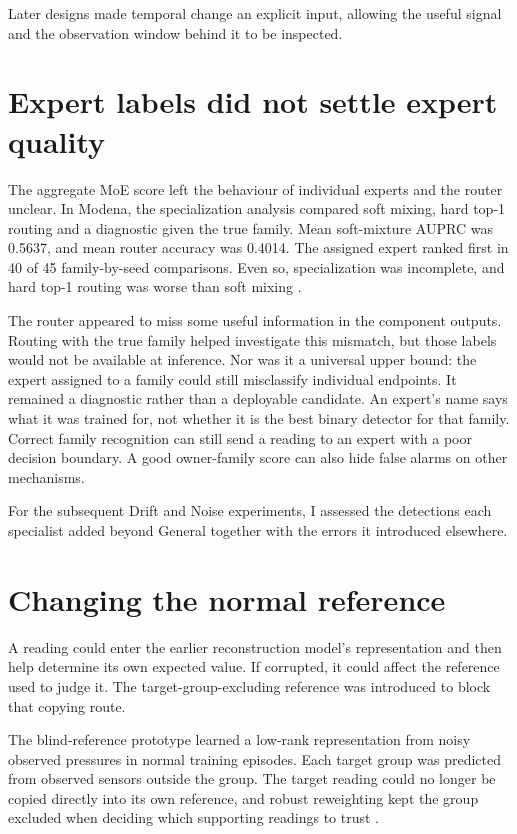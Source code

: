 Later designs made temporal change an explicit input, allowing the useful signal and the observation window behind it to be inspected.

\section{Expert labels did not settle expert quality}
The aggregate MoE score left the behaviour of individual experts and the router unclear. In Modena, the specialization analysis compared soft mixing, hard top-1 routing and a diagnostic given the true family. Mean soft-mixture AUPRC was 0.5637, and mean router accuracy was 0.4014. The assigned expert ranked first in 40 of 45 family-by-seed comparisons. Even so, specialization was incomplete, and hard top-1 routing was worse than soft mixing \cite{projectepisode}.

The router appeared to miss some useful information in the component outputs. Routing with the true family helped investigate this mismatch, but those labels would not be available at inference. Nor was it a universal upper bound: the expert assigned to a family could still misclassify individual endpoints. It remained a diagnostic rather than a deployable candidate. An expert's name says what it was trained for, not whether it is the best binary detector for that family. Correct family recognition can still send a reading to an expert with a poor decision boundary. A good owner-family score can also hide false alarms on other mechanisms.

For the subsequent Drift and Noise experiments, I assessed the detections each specialist added beyond General together with the errors it introduced elsewhere.

\section{Changing the normal reference}
A reading could enter the earlier reconstruction model's representation and then help determine its own expected value. If corrupted, it could affect the reference used to judge it. The target-group-excluding reference was introduced to block that copying route.

The blind-reference prototype learned a low-rank representation from noisy observed pressures in normal training episodes. Each target group was predicted from observed sensors outside the group. The target reading could no longer be copied directly into its own reference, and robust reweighting kept the group excluded when deciding which supporting readings to trust \cite{projectreference}.

